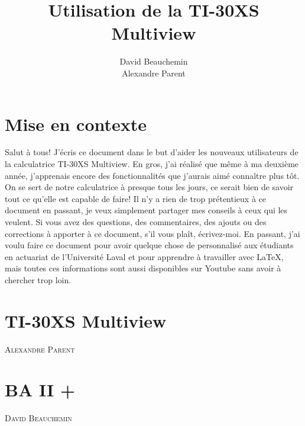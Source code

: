 \documentclass[french]{article}
\title{\vspace{2cm}
  Utilisation de la TI-30XS Multiview
  \vspace{6cm}}
\author{David Beauchemin \\ 
  \vspace{2cm} Alexandre Parent \vspace{2cm}}
\makeatletter
\newcommand{\chapterauthor}[1]{%
  {\parindent0pt\vspace*{-15pt}%
  \linespread{1.1}\large\scshape#1%
  \par\nobreak\vspace*{35pt}}
  \@afterheading%
}
\makeatother
\begin{document}
\maketitle

\newpage

\newpage

\tableofcontents

\setlength{\parskip}{1.8ex}


\pagebreak



\section*{Mise en contexte}
Salut à tous! J'écris ce document dans le but d'aider les nouveaux utilisateurs de la calculatrice TI-30XS Multiview. En gros, j'ai réalisé que même à ma deuxième année, j'apprenais encore des fonctionnalités que j'aurais aimé connaître plus tôt. On se sert de notre calculatrice à presque tous les jours, ce serait bien de savoir tout ce qu'elle est capable de faire! Il n'y a rien de trop prétentieux à ce document en passant, je veux simplement partager mes conseils à ceux qui les veulent. Si vous avez des questions, des commentaires, des ajouts ou des corrections à apporter à ce document, s'il vous plaît, écrivez-moi. En passant, j'ai voulu faire ce document pour avoir quelque chose de personnalisé aux étudiants en actuariat de l'Université Laval et pour apprendre à travailler avec LaTeX, mais toutes ces informations sont aussi disponibles sur Youtube sans avoir à chercher trop loin.

\pagebreak

\section*{TI-30XS Multiview}

\chapterauthor{Alexandre Parent}




\newpage
\section*{BA II +}
\chapterauthor{David Beauchemin}


\end{document}
